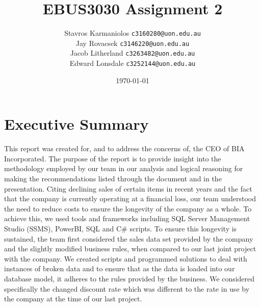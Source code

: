 \documentclass{article}
\title{EBUS3030 Assignment 2}
\author{
        Stavros Karmaniolos 
        \texttt{c3160280@uon.edu.au}\\
        Jay Rovacsek
        \texttt{c3146220@uon.edu.au}\\
        Jacob Litherland
        \texttt{c3263482@uon.edu.au}\\
        Edward Lonsdale
        \texttt{c3252144@uon.edu.au}
    }
\date{\today}
\newcommand\backgroundimage{
        \put(-5,0){
        \parbox[b][\paperheight]{\paperwidth}{
        \vfill
        \centering
        \vfill
    }}}
\begin{document}
    \lstset{style=sql}
    \AddToShipoutPicture{\backgroundimage}

    \begin{titlingpage}
        \maketitle
    \end{titlingpage}

    \tableofcontents

\newpage
    

    
    


    \section{Executive Summary}
    \label{sec:Executive Summary}
    This report was created for, and to address the concerns of, the CEO of BIA Incorporated. The purpose of the report is to provide insight into the methodology employed by our team in our analysis and logical reasoning for making the recommendations listed through the document and in the presentation. Citing declining sales of certain items in recent years and the fact that the company is currently operating at a financial loss, our team understood the need to reduce costs to ensure the longevity of the company as a whole. To achieve this, we used tools and frameworks including SQL Server Management Studio (SSMS), PowerBI, SQL and C\# scripts. To ensure this longevity is sustained, the team first considered the sales data set provided by the company and the slightly modified business rules, when compared to our last joint project with the company. We created scripts and programmed solutions to deal with instances of broken data and to ensure that as the data is loaded into our database model, it adheres to the rules provided by the business. We considered specifically the changed discount rate which was different to the rate in use by the company at the time of our last project. \\
    
\end{document}
